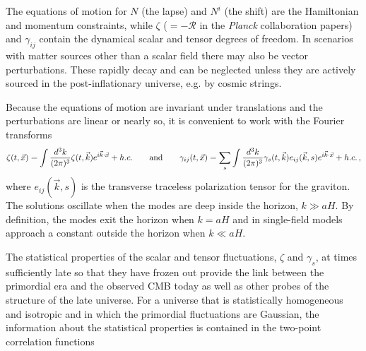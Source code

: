 The equations of motion for $N$ (the lapse) and $N^i$ (the shift) are the Hamiltonian and momentum constraints, while $\zeta$ ($=-\mathcal{R}$ in the {\it Planck} collaboration papers) and $\gamma_{ij}$ contain the dynamical scalar and tensor degrees of freedom. In scenarios with matter sources other than a scalar field there may also be vector perturbations. These rapidly decay and can be neglected unless they are actively sourced in the post-inflationary universe, e.g. by cosmic strings.

Because the equations of motion are invariant under translations and the perturbations are linear or nearly so, it is convenient to work with the Fourier transforms
\begin{equation}
\zeta(t,\vec{x})=\int \frac{d^3 k}{(2\pi)^3}\zeta(t,\vec{k})e^{i \vec{k}\cdot\vec{x}}+h.c.\qquad{\rm and}\qquad\gamma_{ij}(t,\vec{x})=\sum\limits_s\int\frac{d^3k}{(2\pi)^3}\gamma_s(t,\vec{k})e_{ij}(\vec{k},s)e^{i \vec{k}\cdot\vec{x}}+h.c.\,,
\end{equation}
where $e_{ij}(\vec{k},s)$ is the transverse traceless polarization tensor for the graviton. The solutions oscillate when the modes are deep inside the horizon, $k\gg aH$. By definition, the modes exit the horizon when $k=aH$ and in single-field models approach a constant outside the horizon when $k\ll aH$.

The statistical properties of the scalar and tensor fluctuations, $\zeta$ and $\gamma_s$, at times sufficiently late so that they have frozen out provide the link between the primordial era and the observed CMB today as well as other probes of the structure of the late universe. For a universe that is statistically homogeneous and isotropic and in which the primordial fluctuations are Gaussian, the information about the statistical properties is contained in the two-point correlation functions


